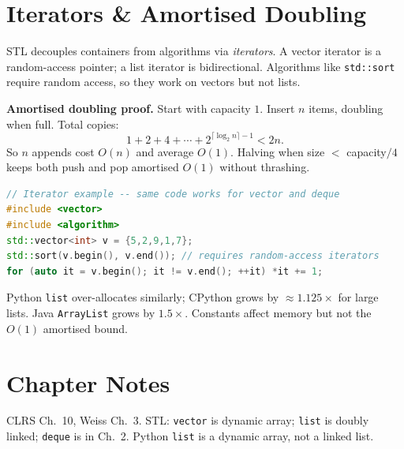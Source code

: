 \section{Iterators \& Amortised Doubling}
\label{sec:iterators-amortised}
STL decouples containers from algorithms via \emph{iterators}. A vector iterator is a random-access pointer; a list iterator is bidirectional. Algorithms like \texttt{std::sort} require random access, so they work on vectors but not lists.

\textbf{Amortised doubling proof.} Start with capacity $1$. Insert $n$ items, doubling when full. Total copies:
\begin{equation}
1+2+4+\cdots+2^{\lceil\log_{2}n\rceil-1} < 2n.
\end{equation}
So $n$ appends cost $O(n)$ and average $O(1)$. Halving when size $<$ capacity$/4$ keeps both push and pop amortised $O(1)$ without thrashing.

\begin{lstlisting}[language=C++]
// Iterator example -- same code works for vector and deque
#include <vector>
#include <algorithm>
std::vector<int> v = {5,2,9,1,7};
std::sort(v.begin(), v.end()); // requires random-access iterators
for (auto it = v.begin(); it != v.end(); ++it) *it += 1;
\end{lstlisting}

\begin{remark}
Python \texttt{list} over-allocates similarly; CPython grows by $\approx 1.125\times$ for large lists. Java \texttt{ArrayList} grows by $1.5\times$. Constants affect memory but not the $O(1)$ amortised bound.
\end{remark}

\section{Chapter Notes}
CLRS Ch.~10, Weiss Ch.~3. STL: \texttt{vector} is dynamic array; \texttt{list} is doubly linked; \texttt{deque} is in Ch.~2. Python \texttt{list} is a dynamic array, not a linked list.


